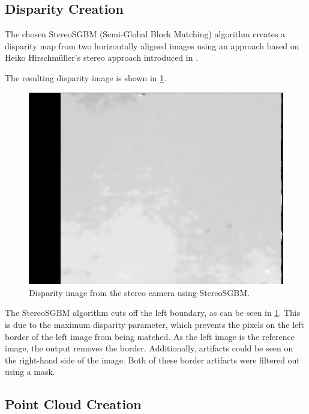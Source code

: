 \subsection{Disparity Creation}\label{subsec:disparity_creation}

The chosen StereoSGBM (Semi-Global Block Matching) algorithm creates a disparity map from two horizontally aligned images using an approach based on Heiko Hirschmüller's stereo approach introduced in \citep{Stereo}. 

The resulting disparity image is shown in \cref{fig:stereo_disp}.

\begin{figure}[h]
\centering
\includegraphics[scale=0.5]{images/stereo_camera_depth/stereo_disparity.png}
\caption{Disparity image from the stereo camera using StereoSGBM.}
\label{fig:stereo_disp}
\end{figure}

The StereoSGBM algorithm cuts off the left boundary, as can be seen in \cref{fig:stereo_disp}. This is due to the maximum disparity parameter, which prevents the pixels on the left border of the left image from being matched. As the left image is the reference image, the output removes the border. Additionally, artifacts could be seen on the right-hand side of the image. Both of these border artifacts were filtered out using a mask.

\subsection{Point Cloud Creation}

